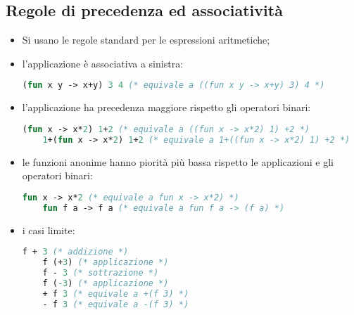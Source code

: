 \subsection{Regole di precedenza ed associatività}
\begin{itemize}
  \item Si usano le regole standard per le espressioni aritmetiche;
  \item l'applicazione è associativa a sinistra:
    \begin{lstlisting}[language=Caml, caption={Esempio di associatività}]
    (fun x y -> x+y) 3 4 (* equivale a ((fun x y -> x+y) 3) 4 *)
    \end{lstlisting}
  \item l'applicazione ha precedenza maggiore rispetto gli operatori binari:
    \begin{lstlisting}[language=Caml, caption={Esempio di precedenza}]
    (fun x -> x*2) 1+2 (* equivale a ((fun x -> x*2) 1) +2 *)
    1+(fun x -> x*2) 1+2 (* equivale a 1+((fun x -> x*2) 1) +2 *)
    \end{lstlisting}
  \item le funzioni anonime hanno piorità più bassa rispetto le applicazioni
    e gli operatori binari:
    \begin{lstlisting}[language=Caml, caption={Esempio di precedenza}]
    fun x -> x*2 (* equivale a fun x -> x*2) *)
    fun f a -> f a (* equivale a fun f a -> (f a) *)
    \end{lstlisting}
  \item i casi limite:
    \begin{lstlisting}[language=Caml, caption={Casi limite di precedenza}]
    f + 3 (* addizione *)
    f (+3) (* applicazione *)
    f - 3 (* sottrazione *)
    f (-3) (* applicazione *)
    + f 3 (* equivale a +(f 3) *)
    - f 3 (* equivale a -(f 3) *)
    \end{lstlisting}

\end{itemize}
